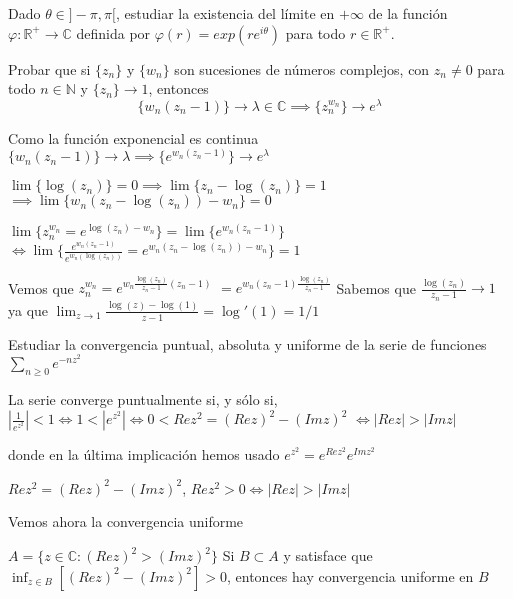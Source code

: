 \begin{ejer}
	Dado $\theta\in]-\pi,\pi[$, estudiar la existencia del límite en $+\infty$ de la función $\varphi : \mathbb{R}^+\rightarrow\mathbb{C}$ definida por $\varphi(r) = exp(re^{i\theta})$ para todo $r\in\mathbb{R}^+$.
\end{ejer}



\begin{ejer}
Probar que si $\{z_n\}$ y $\{w_n\}$ son sucesiones de números complejos, con $z_n \not = 0$ para todo
$n\in \mathbb{N}$ y $\{ z_n \} \rightarrow 1$, entonces
$$ \{w_n(z_n-1)\} \rightarrow \lambda\in\mathbb{C} \implies \{ z_n^{w_n} \}\rightarrow e^{\lambda} $$
\end{ejer}

\begin{sol}

Como la función exponencial es continua
$\{ w_n (z_n-1) \} \rightarrow \lambda \implies \{ e^{w_n(z_n-1)} \} \rightarrow e^{\lambda}$

$\lim \{ \log(z_n) \} = 0 \implies \lim \{ z_n-\log(z_n) \} = 1$
$\implies \lim \{ w_n(z_n-\log(z_n))-w_n \} = 0$

$\lim \{ z_n^{w_n} = e^{\log(z_n)-w_n} \}= \lim \{ e^{w_n (z_n-1)} \}$
$\Longleftrightarrow \lim\{ \frac{e^{w_n(z_n-1)}}{e^{w_n (\log(z_n))}} = e^{w_n (z_n-\log(z_n))-w_n} \} = 1$

Vemos que
$z_n^{w_n} = e^{w_n \frac{\log(z_n)}{z_n-1} (z_n-1)}$
$= e^{w_n (z_n-1) \frac{\log(z_n)}{z_n-1}}$
Sabemos que $ \frac{\log(z_n)}{z_n-1} \rightarrow 1$ ya que
$\lim_{z\rightarrow 1} \frac{\log(z)-\log(1)}{z-1} = \log'(1) = 1/1$

\end{sol}




\begin{ejer}
	Estudiar la convergencia puntual, absoluta y uniforme de la serie de funciones $\sum_{n\geq 0} e^{-nz^2}$
\end{ejer}

\begin{sol}
La serie converge puntualmente si, y sólo si, $| \frac{1}{e^{z^2}} | <1 \Longleftrightarrow 1<|e^{z^2}|  \Longleftrightarrow 0<Rez^2 = (Rez)^2-(Imz)^2 $
$\Longleftrightarrow |Rez| > |Imz|$

donde en la última implicación hemos usado
$e^{z^2} = e^{Rez^2} e^{Imz^2}$

$Rez^2 = (Rez)^2 - (Imz)^2$,
$Rez^2>0 \Longleftrightarrow |Rez| > |Imz|$

Vemos ahora la convergencia uniforme

$A = \{ z\in\mathbb{C} : (Rez)^2>(Imz)^2 \}$
Si $B\subset A$ y satisface que $\inf_{z\in B} [ (Rez)^2-(Imz)^2 ] > 0$, entonces hay convergencia uniforme en $B$
\end{sol}



